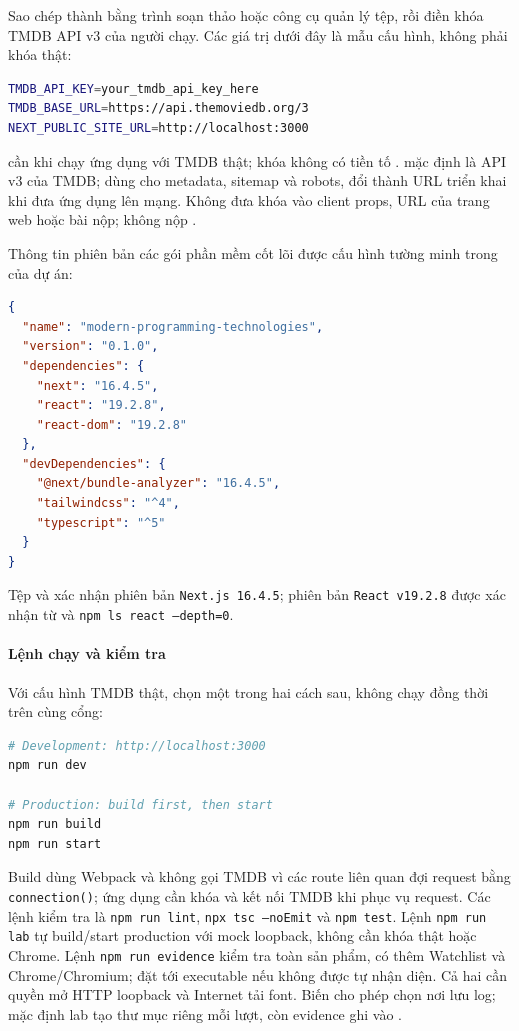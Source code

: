 \documentclass[12pt,a4paper]{extarticle}
\begin{document}
Sao chép  thành  bằng trình soạn thảo hoặc công cụ quản lý tệp, rồi điền khóa TMDB API v3 của người chạy. Các giá trị dưới đây là mẫu cấu hình, không phải khóa thật:
\begin{lstlisting}[language=bash]
TMDB_API_KEY=your_tmdb_api_key_here
TMDB_BASE_URL=https://api.themoviedb.org/3
NEXT_PUBLIC_SITE_URL=http://localhost:3000
\end{lstlisting}
 cần khi chạy ứng dụng với TMDB thật; khóa không có tiền tố .  mặc định là API v3 của TMDB;  dùng cho metadata, sitemap và robots, đổi thành URL triển khai khi đưa ứng dụng lên mạng. Không đưa khóa vào client props, URL của trang web hoặc bài nộp; không nộp .

Thông tin phiên bản các gói phần mềm cốt lõi được cấu hình tường minh trong  của dự án:
\begin{lstlisting}[language=json]
{
  "name": "modern-programming-technologies",
  "version": "0.1.0",
  "dependencies": {
    "next": "16.4.5",
    "react": "19.2.8",
    "react-dom": "19.2.8"
  },
  "devDependencies": {
    "@next/bundle-analyzer": "16.4.5",
    "tailwindcss": "^4",
    "typescript": "^5"
  }
}
\end{lstlisting}
Tệp  và  xác nhận phiên bản \texttt{Next.js 16.4.5}; phiên bản \texttt{React v19.2.8} được xác nhận từ  và \texttt{npm ls react --depth=0}.

\paragraph*{Lệnh chạy và kiểm tra} Với cấu hình TMDB thật, chọn một trong hai cách sau, không chạy đồng thời trên cùng cổng:
\begin{lstlisting}[language=bash]
# Development: http://localhost:3000
npm run dev

# Production: build first, then start
npm run build
npm run start
\end{lstlisting}
Build dùng Webpack và không gọi TMDB vì các route liên quan đợi request bằng \texttt{connection()}; ứng dụng cần khóa và kết nối TMDB khi phục vụ request. Các lệnh kiểm tra là \texttt{npm run lint}, \texttt{npx tsc --noEmit} và \texttt{npm test}. Lệnh \texttt{npm run lab} tự build/start production với mock loopback, không cần khóa thật hoặc Chrome. Lệnh \texttt{npm run evidence} kiểm tra toàn sản phẩm, có thêm Watchlist và Chrome/Chromium; đặt  tới executable nếu không được tự nhận diện. Cả hai cần quyền mở HTTP loopback và Internet tải font. Biến  cho phép chọn nơi lưu log; mặc định lab tạo thư mục riêng mỗi lượt, còn evidence ghi vào .
\end{document}
